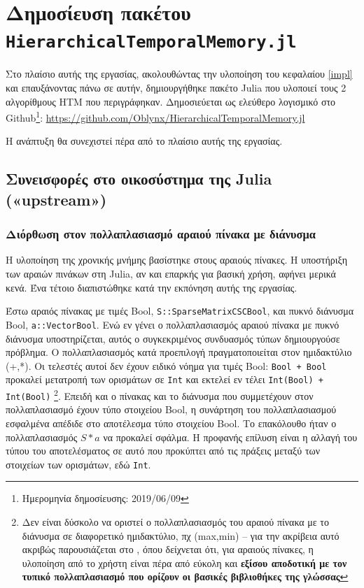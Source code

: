\section{Δημοσίευση πακέτου \texttt{HierarchicalTemporalMemory.jl}}

	Στο πλαίσιο αυτής της εργασίας, ακολουθώντας την υλοποίηση του κεφαλαίου \ref{impl} και επαυξάνοντας πάνω σε αυτήν,
	δημιουργήθηκε πακέτο Julia που υλοποιεί τους 2 αλγορίθμους HTM που περιγράφηκαν.
	Δημοσιεύεται ως ελεύθερο λογισμικό \parencite{stallmanFreeSoftwareFree2002} στο Github\footnote{Ημερομηνία δημοσίευσης: 2019/06/09}:
	\url{https://github.com/Oblynx/HierarchicalTemporalMemory.jl}

	Η ανάπτυξη θα συνεχιστεί πέρα από το πλαίσιο αυτής της εργασίας.

\subsection{Συνεισφορές στο οικοσύστημα της Julia («upstream»)}

	\subsubsection{Διόρθωση στον πολλαπλασιασμό αραιού πίνακα με διάνυσμα}

	Η υλοποίηση της χρονικής μνήμης βασίστηκε στους αραιούς πίνακες.
	Η υποστήριξη των αραιών πινάκων στη Julia, αν και επαρκής για βασική χρήση, αφήνει μερικά κενά.
	Ένα τέτοιο διαπιστώθηκε κατά την εκπόνηση αυτής της εργασίας.

	Έστω αραιός πίνακας με τιμές Bool, \texttt{S::SparseMatrixCSC{Bool}},
	και πυκνό διάνυσμα Bool, \texttt{a::Vector{Bool}}.
	Ενώ εν γένει ο πολλαπλασιασμός αραιού πίνακα με πυκνό διάνυσμα υποστηρίζεται, αυτός ο συγκεκριμένος συνδυασμός τύπων δημιουργούσε πρόβλημα.
	Ο πολλαπλασιασμός κατά προεπιλογή πραγματοποιείται στον ημιδακτύλιο (+,*).
	Οι τελεστές αυτοί δεν έχουν ειδικό νόημα για τιμές Bool: \texttt{Bool + Bool} προκαλεί μετατροπή των ορισμάτων σε \texttt{Int} και εκτελεί εν τέλει \texttt{Int(Bool) + Int(Bool)}
	\footnote{ Δεν είναι δύσκολο να οριστεί ο πολλαπλασιασμός του αραιού πίνακα με το διάνυσμα σε διαφορετικό ημιδακτύλιο, πχ (max,min) --
	για την ακρίβεια αυτό ακριβώς παρουσιάζεται στο \cite{shahNovelAlgebrasAdvanced2013}, όπου δείχνεται ότι, για αραιούς πίνακες,
	η υλοποίηση από το χρήστη είναι πέρα από εύκολη και \textbf{εξίσου αποδοτική με τον τυπικό πολλαπλασιασμό που ορίζουν οι βασικές βιβλιοθήκες της γλώσσας} }.
	Επειδή και ο πίνακας και το διάνυσμα που συμμετέχουν στον πολλαπλασιασμό έχουν τύπο στοιχείου Bool,
	η συνάρτηση του πολλαπλασιασμού εσφαλμένα απέδιδε στο αποτέλεσμα τύπο στοιχείου Bool.
	Το επακόλουθο ήταν ο πολλαπλασιασμός $S*a$ να προκαλεί σφάλμα.
	Η προφανής επίλυση είναι η αλλαγή του τύπου του αποτελέσματος σε αυτό που προκύπτει από τις πράξεις μεταξύ των στοιχείων των ορισμάτων, εδώ \texttt{Int}.

